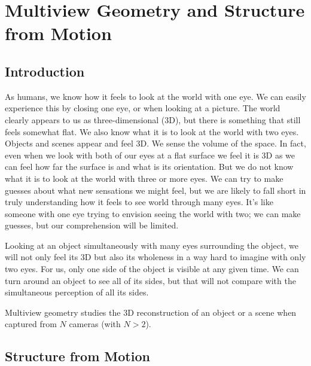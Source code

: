\chapter{Multiview Geometry and Structure from Motion}
\label{chapter:3D_multiview}

\section{Introduction}

As humans, we know how it feels to look at the world with one eye. We can easily experience this by closing one eye, or when looking at a picture. The world clearly appears to us as three-dimensional (3D), but there is something that still feels somewhat flat.
We also know what it is to look at the world with two eyes. Objects and scenes appear and feel 3D. We sense the volume of the space. In fact, even when we look with both of our eyes at a flat surface we feel it is 3D as we can feel how far the surface is and what is its orientation.
But we do not know what it is to look at the world with three or more eyes. We can try to make guesses about what new sensations we might feel, but we are likely to fall short in truly understanding how it feels to see world through many eyes.  It's like someone with one eye trying to envision seeing the world with two; we can make guesses, but our comprehension will be limited.


Looking at an object simultaneously with many eyes surrounding the object, we will not only feel its 3D but also its wholeness in a way hard to imagine with only two eyes. For us, only one side of the object is visible at any given time. We can turn around an object to see all of its sides, but that will not compare with the simultaneous perception of all its sides.

Multiview geometry studies the 3D reconstruction of an object or a scene when captured from $N$ cameras (with $N>2$).


\section{Structure from Motion}


